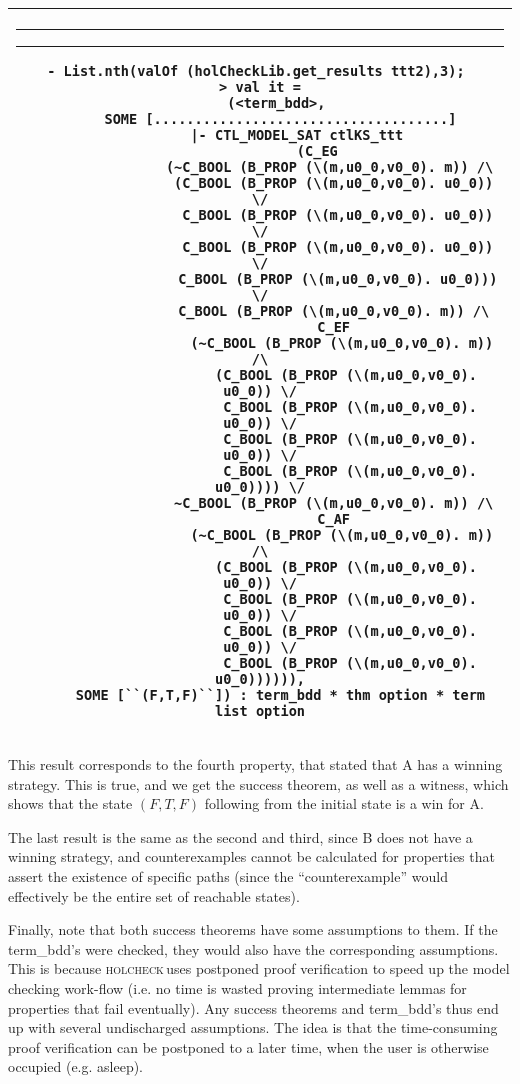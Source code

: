 \documentclass{article}
\makeatletter
\newcommand{\hc}{\textsc{holcheck\,}}
\newlength{\hsbw}
\newcounter{sessioncount}
\newcommand\MLSpacing{13pt}
\newenvironment{session}{\begin{flushleft}
 \begin{tabular}{@{}|c@{}|@{}}\hline 
 \begin{minipage}[b]{\hsbw}
 \vspace*{-.5pt}
 \begin{flushright}
 \rule{0.01in}{.15in}\rule{0.3in}{0.01in}\hspace{-0.35in}
 \raisebox{0.04in}{\makebox[0.3in][c]{\footnotesize\sl \thesessioncount}}
 \end{flushright}
 \vspace*{-.45in}
 \begingroup\small\baselineskip\MLSpacing}{\endgroup\end{minipage}\\ \hline 
 \end{tabular}
 \end{flushleft}
 \stepcounter{sessioncount}}
\makeatother
\begin{document}
\begin{session}\begin{verbatim}
- List.nth(valOf (holCheckLib.get_results ttt2),3); 
> val it =
    (<term_bdd>,
     SOME [....................................]
         |- CTL_MODEL_SAT ctlKS_ttt
              (C_EG
                 (~C_BOOL (B_PROP (\(m,u0_0,v0_0). m)) /\
                  (C_BOOL (B_PROP (\(m,u0_0,v0_0). u0_0)) \/
                   C_BOOL (B_PROP (\(m,u0_0,v0_0). u0_0)) \/
                   C_BOOL (B_PROP (\(m,u0_0,v0_0). u0_0)) \/
                   C_BOOL (B_PROP (\(m,u0_0,v0_0). u0_0))) \/
                  C_BOOL (B_PROP (\(m,u0_0,v0_0). m)) /\
                  C_EF
                    (~C_BOOL (B_PROP (\(m,u0_0,v0_0). m)) /\
                     (C_BOOL (B_PROP (\(m,u0_0,v0_0). u0_0)) \/
                      C_BOOL (B_PROP (\(m,u0_0,v0_0). u0_0)) \/
                      C_BOOL (B_PROP (\(m,u0_0,v0_0). u0_0)) \/
                      C_BOOL (B_PROP (\(m,u0_0,v0_0). u0_0)))) \/
                  ~C_BOOL (B_PROP (\(m,u0_0,v0_0). m)) /\
                  C_AF
                    (~C_BOOL (B_PROP (\(m,u0_0,v0_0). m)) /\
                     (C_BOOL (B_PROP (\(m,u0_0,v0_0). u0_0)) \/
                      C_BOOL (B_PROP (\(m,u0_0,v0_0). u0_0)) \/
                      C_BOOL (B_PROP (\(m,u0_0,v0_0). u0_0)) \/
                      C_BOOL (B_PROP (\(m,u0_0,v0_0). u0_0)))))),
     SOME [``(F,T,F)``]) : term_bdd * thm option * term list option
\end{verbatim}\end{session}

This result corresponds to the fourth property, that stated that A has a winning strategy. This is true, and we get the success theorem, as well as a witness, which shows that the state \((F,T,F)\) following from the initial state is a win for A. 

The last result is the same as the second and third, since B does not have a winning strategy, and counterexamples cannot be calculated for properties that assert the existence of specific paths (since the ``counterexample'' would effectively be the entire set of reachable states).

Finally, note that both success theorems have some assumptions to them. If the term\_bdd's were checked, they would also have the corresponding assumptions. This is because \hc uses postponed proof verification to speed up the model checking work-flow (i.e. no time is wasted proving intermediate lemmas for properties that fail eventually). Any success theorems and term\_bdd's thus end up with several undischarged assumptions. The idea is that the time-consuming proof verification can be postponed to a later time, when the user is otherwise occupied (e.g. asleep).
\end{document}
